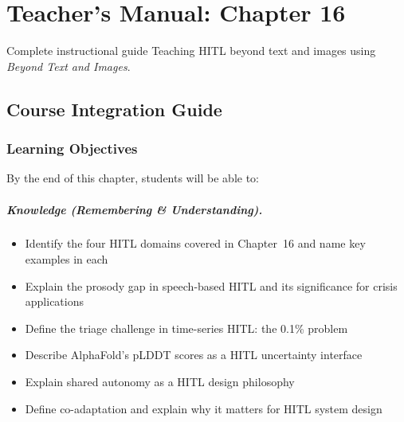 
\chapter{Teacher's Manual: Chapter 16}
\label{ch:teacher-ch16}

\begin{chapterquote}{Complete instructional guide}
Teaching HITL beyond text and images using \emph{Beyond Text and Images}.
\end{chapterquote}

\section{Course Integration Guide}

\subsection{Learning Objectives}

By the end of this chapter, students will be able to:

\paragraph{Knowledge (Remembering \& Understanding).}
\begin{itemize}
    \item Identify the four HITL domains covered in Chapter~16 and name key examples in each
    \item Explain the prosody gap in speech-based HITL and its significance for crisis applications
    \item Define the triage challenge in time-series HITL: the 0.1\% problem
    \item Describe AlphaFold's pLDDT scores as a HITL uncertainty interface
    \item Explain shared autonomy as a HITL design philosophy
    \item Define co-adaptation and explain why it matters for HITL system design
\end{itemize}

